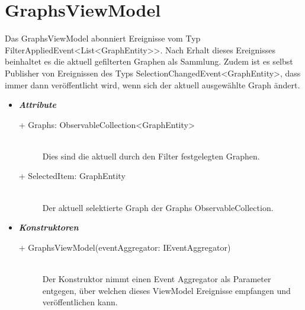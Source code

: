 \documentclass[13pt]{scrreprt}
\begin{document}
	\section{GraphsViewModel}
	Das GraphsViewModel abonniert Ereignisse vom Typ FilterAppliedEvent<List<GraphEntity>>. Nach Erhalt dieses Ereignisses beinhaltet es die aktuell gefilterten Graphen als Sammlung. Zudem ist es selbst Publisher von Ereignissen des Typs SelectionChangedEvent<GraphEntity>, dass immer dann ver\"offentlicht wird, wenn sich der aktuell ausgew\"ahlte Graph \"andert.
	\begin{itemize}[label = {$\circ$}]
		\item {\large \textbf{\textit{Attribute}}\par}
		\begin{description}
			\item [+ Graphs: ObservableCollection<GraphEntity>] \hfill \\Dies sind die aktuell durch den Filter festgelegten Graphen.
			\item [+ SelectedItem: GraphEntity] \hfill \\ Der aktuell selektierte Graph der Graphs ObservableCollection.
		\end{description}
		\item {\large \textbf{\textit{Konstruktoren}}\par}
		\begin{description}
			\item [+ GraphsViewModel(eventAggregator: IEventAggregator)] \hfill \\ Der Konstruktor nimmt einen Event Aggregator als Parameter entgegen, über welchen dieses ViewModel Ereignisse empfangen und ver\"offentlichen kann.
		\end{description}
	\end{itemize}
	\newpage
\end{document}
